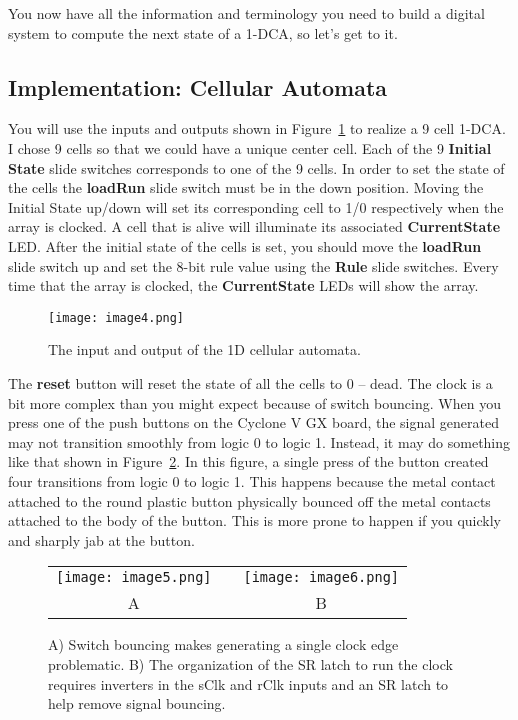 You now have all the information and terminology you need to build a
digital system to compute the next state of a 1-DCA, so let's get to it.

\subsection{Implementation: Cellular Automata}

You will use the inputs and outputs shown in Figure~\ref{fig:caDevBoard} to realize a
9 cell 1-DCA. I chose 9 cells so that we could have a unique center
cell. Each of the 9 \textbf{Initial State} slide switches corresponds to
one of the 9 cells. In order to set the state of the cells the
\textbf{loadRun} slide switch must be in the down position. Moving the
Initial State up/down will set its corresponding cell to 1/0
respectively when the array is clocked. A cell that is alive will
illuminate its associated \textbf{CurrentState} LED. After the initial
state of the cells is set, you should move the \textbf{loadRun} slide
switch up and set the 8-bit rule value using the \textbf{Rule} slide
switches. Every time that the array is clocked, the
\textbf{CurrentState} LEDs will show the array.

\begin{figure}[ht]
\texttt{[image: image4.png]}
\caption{The input and output of the 1D cellular automata.}
\label{fig:caDevBoard}
\end{figure}

The \textbf{reset} button will reset the state of all the cells to 0 --
dead. The clock is a bit more complex than you might expect because of
switch bouncing. When you press one of the push buttons on the Cyclone V
GX board, the signal generated may not transition smoothly from logic 0
to logic 1. Instead, it may do something like that shown in Figure~\ref{fig:caSwitchBounce}. In
this figure, a single press of the button created four transitions from
logic 0 to logic 1. This happens because the metal contact attached to
the round plastic button physically bounced off the metal contacts
attached to the body of the button. This is more prone to happen if you
quickly and sharply jab at the button.

\begin{figure}[ht]
\begin{tabular}{ccc }
\texttt{[image: image5.png]} &  & \texttt{[image: image6.png]} \\
A  & & B \\ 
\end{tabular}
\caption{A) Switch bouncing makes generating a single clock edge problematic.
B) The organization of the SR latch to run the clock requires
inverters in the sClk and rClk inputs and an SR latch to help remove
signal bouncing.}
\label{fig:caSwitchBounce}
\end{figure}


